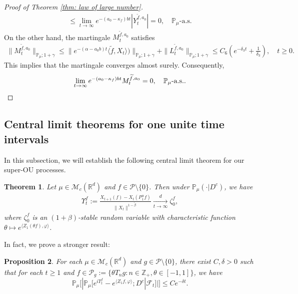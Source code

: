 \documentclass[12pt,a4paper]{amsart}
\theoremstyle{plain}
\newtheorem{thm}{Theorem}[section]
\newtheorem{prop}[thm]{Proposition}
\theoremstyle{definition}
\numberwithin{equation}{section}
\begin{document}
\begin{proof}[Proof of Theorem \ref{thm: law of large number}]
\begin{align}
    \leq  \lim_{t\rightarrow \infty}e^{-(a_0 - \kappa_f)bt}|Y_t^{\widetilde{f},a_0}|=0, 
    \quad \mathbb P_\mu\text{-a.s.}
  \end{align}
  On the other hand, the martingale $M_t^{\widetilde{f},a_0}$ satisfies
  \begin{align}
    \|M_t^{\widetilde{f},a_0}\|_{\mathbb{P}_{\mu};1+\gamma}
    \leq \|e^{-(\alpha-a_0 b)t}\langle \widetilde{f},X_t\rangle)\|_{\mathbb{P}_{\mu};1+\gamma}+\|L_t^{\widetilde{f},a_0}\|_{\mathbb{P}_{\mu};1+\gamma}
    \leq C_6(e^{-\delta_3 t}+\frac{1}{\delta_3}),
    \quad t\geq 0.
  \end{align}
  This implies that the martingale converges almost surely.
  Consequently,
  \[
    \lim_{t\rightarrow\infty} e^{-(a_0-\kappa_f)bt}M_t^{\widetilde{f},a_0}
    = 0,
    \quad \mathbb P_\mu\text{-a.s.}.
    \qedhere
  \]
\end{proof}

\subsection{Central limit theorems for one unite time intervals}
\label{sec:critical}
In this subsection, we will establish the following  central limit theorem for our super-OU processes.
\begin{thm}
  \label{lem:PR:LC}
  Let $\mu \in \mathcal M_c(\mathbb R^d)$ and $f\in \mathcal{P}\setminus \{0\}$.
  Then under $\mathbb{P}_{\mu}(\cdot | D ^c)$, we have
  \begin{align}
    \label{eq:PR:LC:1}
    \Upsilon^f_t
    := \frac{X_{t+1} (f) - X_t(P_1^\alpha f)}{\| X_t\|^{1-\tilde \beta}}
    \xrightarrow[t\to \infty]{d}\zeta^f_0,
  \end{align}
  where $\zeta^f_0$ is an $(1+\beta)$-stable random variable with characteristic function $\theta\mapsto e^{\langle Z_1(\theta f), \varphi\rangle}$.
\end{thm}

In fact, we prove a stronger result:

\begin{prop}
  \label{thm:Key}
  For each $\mu \in \mathcal M_c(\mathbb R^d)$ and $g \in \mathcal P \setminus \{0\}$, there exist $C,\delta>0$ such that
  for each $t\geq 1$ and $f \in \mathcal P_g:= \{\theta T_ng:n \in \mathbb Z_+, \theta \in [-1,1]\}$, we have
  \[
    \mathbb P_\mu
    \Big[  |\mathbb P_\mu [e^{i\Upsilon^f_t} - e^{\langle Z_1f, \varphi\rangle}; D^c | \mathscr F_t ]  |\Big]
    \leq C e^{- \delta t}.
  \]
\end{prop}
\end{document}
